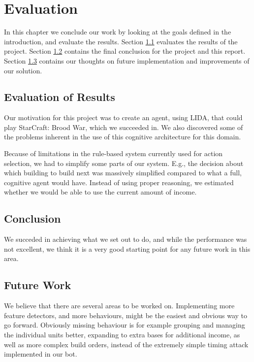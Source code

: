 
\chapter{Evaluation}
In this chapter we conclude our work by looking at the goals defined in the
introduction, and evaluate the results.
Section \ref{sec:evalres} evaluates the results of the project.
Section \ref{sec:conclusion} contains the final conclusion for the project and this report. 
Section \ref{sec:futurework} contains our thoughts on future implementation and improvements of our solution.


\section{Evaluation of Results}
\label{sec:evalres}
Our motivation for this project was to create an agent, using LIDA, that could play StarCraft: Brood War, which we succeeded in. We also discovered some of the problems inherent in the use of this cognitive architecture for this domain.

Because of limitations in the rule-based system currently used for action selection, we had to simplify some parts of our system. E.g., the decision about which building to build next was massively simplified compared to what a full, cognitive agent would have. Instead of using proper reasoning, we estimated whether we would be able to use the current amount of income.

\section{Conclusion}
\label{sec:conclusion}
We succeded in achieving what we set out to do, and while the performance was not excellent, we think it is a very good starting point for any future work in this area.

\section{Future Work}
\label{sec:futurework}
We believe that there are several areas to be worked on. Implementing more feature detectors, and more behaviours, might be the easiest and obvious way to go forward. Obviously missing behaviour is for example grouping and managing the individual units better, expanding to extra bases for additional income, as well as more complex build orders, instead of the extremely simple timing attack implemented in our bot.

